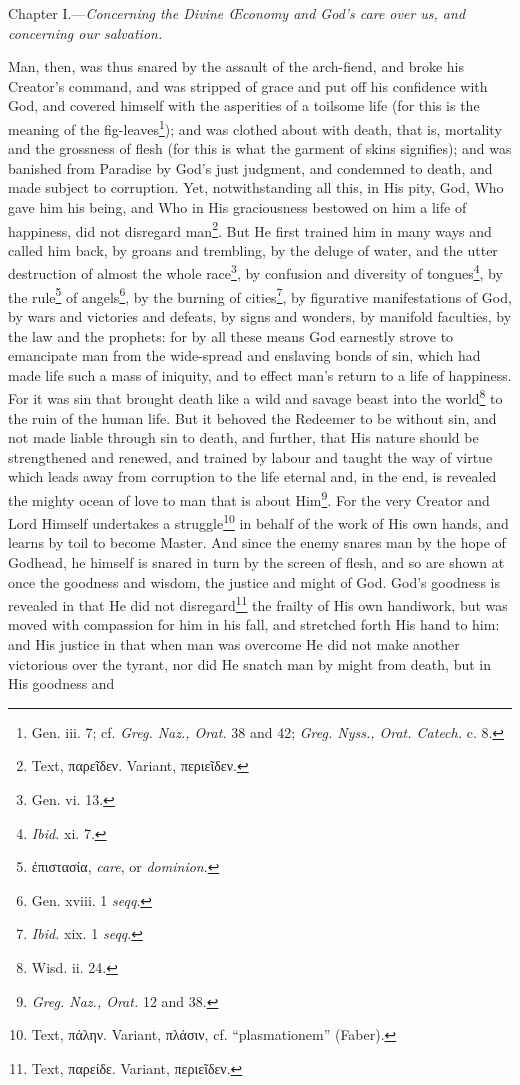 

Chapter I.—\emph{Concerning the Divine Œconomy and God’s care over us, and concerning our salvation.}

Man, then, was thus snared by the assault of the arch-fiend, and broke his Creator’s command, and was stripped of grace and put off his confidence with God, and covered himself with the asperities of a toilsome life (for this is the meaning of the fig-leaves\footnote{Gen. iii. 7; cf. \emph{Greg. Naz., Orat. }38 and 42; \emph{Greg. Nyss., Orat. Catech. }c. 8.}); and was clothed about with death, that is, mortality and the grossness of flesh (for this is what the garment of skins signifies); and was banished from Paradise by God’s just judgment, and condemned to death, and made subject to corruption. Yet, notwithstanding all this, in His pity, God, Who gave him his being, and Who in His graciousness bestowed on him a life of happiness, did not disregard man\footnote{Text, \textgreek{παρεῖδεν}. Variant, \textgreek{περιεῖδεν}.}. But He first trained him in many ways and called him back, by groans and trembling, by the deluge of water, and the utter destruction of almost the whole race\footnote{Gen. vi. 13.}, by confusion and diversity of tongues\footnote{\emph{Ibid. }xi. 7.}, by the rule\footnote{\textgreek{ἐπιστασία}, \emph{care}, or \emph{dominion}.} of angels\footnote{Gen. xviii. 1 \emph{seqq}.}, by the burning of cities\footnote{\emph{Ibid.} xix. 1 \emph{seqq}.}, by figurative manifestations of God, by wars and victories and defeats, by signs and wonders, by manifold faculties, by the law and the prophets: for by all these means God earnestly strove to emancipate man from the wide-spread and enslaving bonds of sin, which had made life such a mass of iniquity, and to effect man’s return to a life of happiness. For it was sin that brought death like a wild and savage beast into the world\footnote{Wisd. ii. 24.} to the ruin of the human life. But it behoved the Redeemer to be without sin, and not made liable through sin to death, and further, that His nature should be strengthened and renewed, and trained by labour and taught the way of virtue which leads away from corruption to the life eternal and, in the end, is revealed the mighty ocean of love to man that is about Him\footnote{\emph{Greg. Naz., Orat. }12 and 38.}. For the very Creator and Lord Himself undertakes a struggle\footnote{Text, \textgreek{πάλην}. Variant, \textgreek{πλάσιν}, cf. “plasmationem” (Faber).} in behalf of the work of His own hands, and learns by toil to become Master. And since the enemy snares man by the hope of Godhead, he himself is snared in turn by the screen of flesh, and so are shown at once the goodness and wisdom, the justice and might of God. God’s goodness is revealed in that He did not disregard\footnote{Text, \textgreek{παρείδε}. Variant, \textgreek{περιεῖδεν}.} the frailty of His own handiwork, but was moved with compassion for him in his fall, and stretched forth His hand to him: and His justice in that when man was overcome He did not make another victorious over the tyrant, nor did He snatch man by might from death, but in His goodness and 